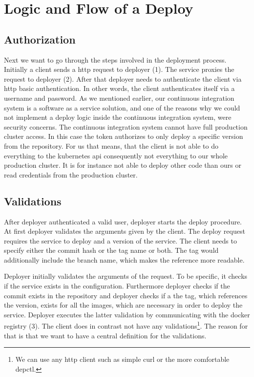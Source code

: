 \section{Logic and Flow of a Deploy}

\subsection{Authorization}

Next we want to go through the steps involved in the deployment process. Initially a
client sends a http request to deployer (1). The service proxies the request to deployer
(2). After that deployer needs to authenticate the client via http basic
authentication. In other words, the client authenticates itself via a username and
password. As we mentioned earlier, our continuous integration system is a software as a
service solution, and one of the reasons why we could not implement a deploy logic inside
the continuous integration system, were security concerns. The continuous integration
system cannot have full production cluster access. In this case the token authorizes to
only deploy a specific version from the repository. For us that means, that the client is
not able to do everything to the kubernetes api consequently not everything to our whole
production cluster. It is for instance not able to deploy other code than ours or read
credentials from the production cluster.

\subsection{Validations}

After deployer authenticated a valid user, deployer starts the deploy procedure. At first
deployer validates the arguments given by the client. The deploy request requires the
service to deploy and a version of the service. The client needs to specify either the
commit hash or the tag name or both. The tag would additionally include the branch name,
which makes the reference more readable.

Deployer initially validates the arguments of the request. To be specific, it checks if
the service exists in the configuration. Furthermore deployer checks if the commit exists
in the repository and deployer checks if a the tag, which references the version, exists
for all the images, which are necessary in order to deploy the service. Deployer executes
the latter validation by communicating with the docker registry (3). The client does in
contrast not have any validations\footnote{We can use any http client such as simple curl
or the more comfortable depctl.}. The reason for that is that we want to have a central
definition for the validations.

